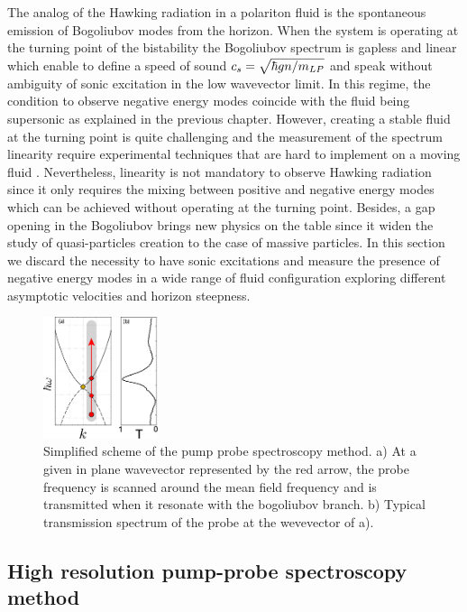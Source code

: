 The analog of the Hawking radiation in a polariton fluid is the spontaneous emission of Bogoliubov modes from the horizon. When the system is operating at the turning point of the bistability the Bogoliubov spectrum 
is gapless and linear which enable to define a speed of sound $c_s = \sqrt{\hbar g n /m_{LP}}$ and speak without ambiguity of sonic excitation in the low wavevector limit. In this regime, the condition to observe negative energy modes coincide with the fluid being supersonic as explained in the previous chapter. 
However, creating a stable fluid at the turning point is quite challenging and the measurement of the spectrum linearity require experimental techniques that are hard to implement on a moving fluid \cite{claude_phd}. Nevertheless, linearity is not mandatory to observe Hawking radiation since 
it only requires the mixing between positive and negative energy modes which can be achieved without operating at the turning point. Besides, a gap opening in the Bogoliubov brings new physics on the table since it widen the study of quasi-particles creation to the case of massive particles. In this
section we discard the necessity to have sonic excitations and measure the presence of negative energy modes in a wide range of fluid configuration exploring different asymptotic velocities and horizon steepness.

\begin{figure}[h]
    \centering
    \includegraphics[width=0.3\textwidth]{chap3_custom_st/fig/setup_bogoliubov.pdf}
    \caption{Simplified scheme of the pump probe spectroscopy method. a) At a given in plane wavevector represented by the red arrow, the probe frequency is scanned around the mean field frequency and is transmitted when it resonate with the bogoliubov branch. b) Typical transmission spectrum of the probe at the wevevector of a).}
    \label{fig:setup_bogo}
\end{figure}


\subsection{High resolution pump-probe spectroscopy method}

